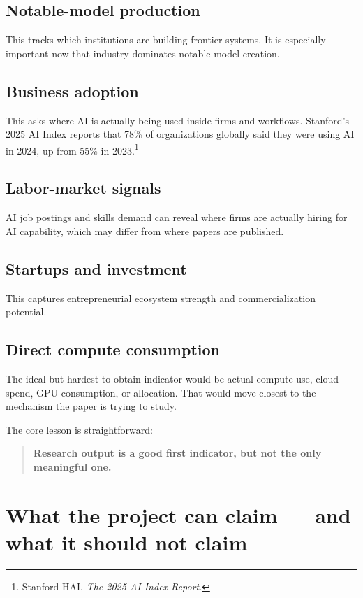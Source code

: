 \documentclass[11pt]{article}
\begin{document}
\subsection{Notable-model production}

This tracks which institutions are building frontier systems. It is especially important now that industry dominates notable-model creation.

\subsection{Business adoption}

This asks where AI is actually being used inside firms and workflows. Stanford's 2025 AI Index reports that 78\% of organizations globally said they were using AI in 2024, up from 55\% in 2023.\footnote{Stanford HAI, \emph{The 2025 AI Index Report}.}

\subsection{Labor-market signals}

AI job postings and skills demand can reveal where firms are actually hiring for AI capability, which may differ from where papers are published.

\subsection{Startups and investment}

This captures entrepreneurial ecosystem strength and commercialization potential.

\subsection{Direct compute consumption}

The ideal but hardest-to-obtain indicator would be actual compute use, cloud spend, GPU consumption, or allocation. That would move closest to the mechanism the paper is trying to study.

The core lesson is straightforward:

\begin{quote}
\textbf{Research output is a good first indicator, but not the only meaningful one.}
\end{quote}

\section{What the project can claim --- and what it should not claim}
\end{document}

